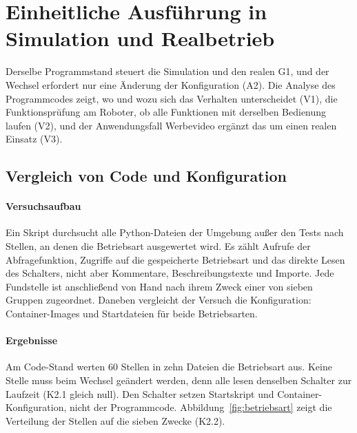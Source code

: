\section{Einheitliche Ausführung in Simulation und Realbetrieb}
\label{sec:eval_f1}
Derselbe Programmstand steuert die Simulation und den realen G1, und der Wechsel erfordert nur eine Änderung der Konfiguration (A2).
Die Analyse des Programmcodes zeigt, wo und wozu sich das Verhalten unterscheidet (V1), die Funktionsprüfung am Roboter, ob alle Funktionen mit derselben Bedienung laufen (V2), und der Anwendungsfall Werbevideo ergänzt das um einen realen Einsatz (V3).

\subsection{Vergleich von Code und Konfiguration}
\label{sec:eval_code}

\paragraph*{Versuchsaufbau}
Ein Skript durchsucht alle Python-Dateien der Umgebung außer den Tests nach Stellen, an denen die Betriebsart ausgewertet wird.
Es zählt Aufrufe der Abfragefunktion, Zugriffe auf die gespeicherte Betriebsart und das direkte Lesen des Schalters, nicht aber Kommentare, Beschreibungstexte und Importe.
Jede Fundstelle ist anschließend von Hand nach ihrem Zweck einer von sieben Gruppen zugeordnet.
Daneben vergleicht der Versuch die Konfiguration: Container-Images und Startdateien für beide Betriebsarten.

\paragraph*{Ergebnisse}
Am Code-Stand werten 60 Stellen in zehn Dateien die Betriebsart aus.
Keine Stelle muss beim Wechsel geändert werden, denn alle lesen denselben Schalter zur Laufzeit (K2.1 gleich null).
Den Schalter setzen Startskript und Container-Konfiguration, nicht der Programmcode.
Abbildung~\ref{fig:betriebsart} zeigt die Verteilung der Stellen auf die sieben Zwecke (K2.2).

